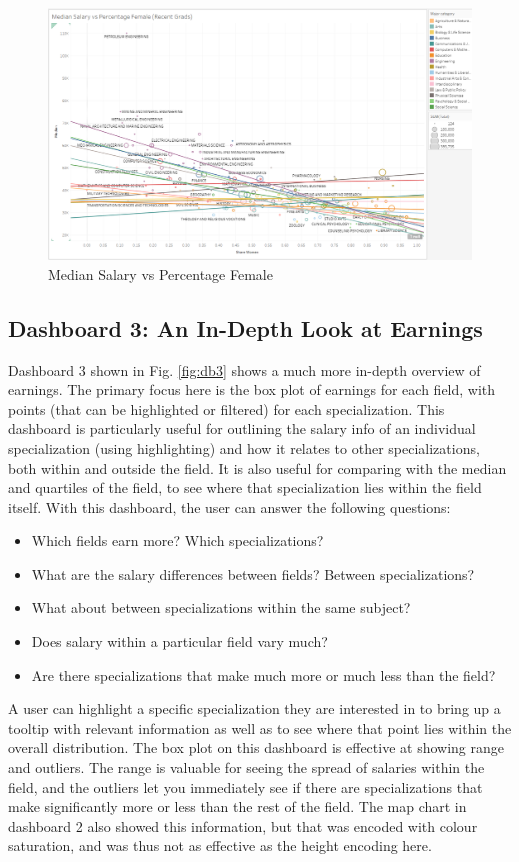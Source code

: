 \documentclass[sigchi]{acmart}
\begin{document}
  \begin{figure}[thpb]
  \includegraphics[width=1.0\textwidth]{SP1.png}
     \caption{Median Salary vs Percentage Female}
         \label{fig:sp1}
  \end{figure}
  
\subsection{Dashboard 3: An In-Depth Look at Earnings}
\label{sec:db3}

Dashboard 3 shown in Fig. \ref{fig:db3} shows a much more in-depth overview of earnings. The primary focus here is the box plot of earnings for each field, with points (that can be highlighted or filtered) for each specialization. This dashboard is particularly useful for outlining the salary info of an individual specialization (using highlighting) and how it relates to other specializations, both within and outside the field. It is also useful for comparing with the median and quartiles of the field, to see where that specialization lies within the field itself. With this dashboard, the user can answer the following questions:
\begin{itemize}
\item{Which fields earn more? Which specializations?}
\item{What are the salary differences between fields? Between specializations?}
\item{What about between specializations within the same subject?}
\item{Does salary within a particular field vary much?}
\item{Are there specializations that make much more or much less than the field?}
\end{itemize}
A user can highlight a specific specialization they are interested in to bring up a tooltip with relevant information as well as to see where that point lies within the overall distribution. The box plot on this dashboard is effective at showing range and outliers. The range is valuable for seeing the spread of salaries within the field, and the outliers let you immediately see if there are specializations that make significantly more or less than the rest of the field. The map chart in dashboard 2 also showed this information, but that was encoded with colour saturation, and was thus not as effective as the height encoding here.
\end{document}
